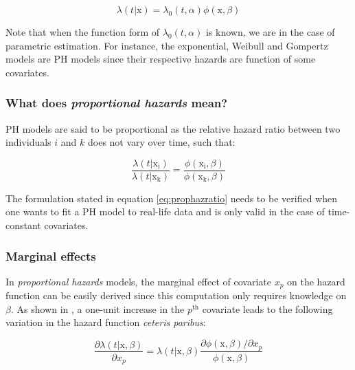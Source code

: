 \documentclass[
]{book}
\begin{document}
\begin{equation}
    \lambda(t|\pmb{\mathrm{x}}) = \lambda_0 (t,\alpha)  \phi(\pmb{\mathrm{x}}, \beta) 
    \label{eq:ph}
\end{equation}

Note that when the function form of \(\lambda_0 (t,\alpha)\) is known, we are in the case of parametric estimation. For instance, the exponential, Weibull and Gompertz models are PH models since their respective hazards are function of some covariates.

\hypertarget{what-does-proportional-hazards-mean}{%
\subsubsection*{\texorpdfstring{What does \emph{proportional hazards} mean?}{What does proportional hazards mean?}}\label{what-does-proportional-hazards-mean}}

PH models are said to be proportional as the relative hazard ratio between two individuals \(i\) and \(k\) does not vary over time, such that:

\begin{equation}
  \frac{\lambda(t|\mathrm{x_i})}{\lambda(t|\mathrm{x_k})} = \frac{\phi(\mathrm{x_i}, \beta) }{\phi(\mathrm{x_k}, \beta)}
  \label{eq:prophazratio}
\end{equation}

The formulation stated in equation \eqref{eq:prophazratio} needs to be verified when one wants to fit a PH model to real-life data and is only valid in the case of time-constant covariates.

\hypertarget{marginal-effects}{%
\subsubsection*{Marginal effects}\label{marginal-effects}}

In \emph{proportional hazards} models, the marginal effect of covariate \(x_p\) on the hazard function can be easily derived since this computation only requires knowledge on \(\beta\). As shown in \citet{CAMERON_TRIVEDI}, a one-unit increase in the \(p^{\text{th}}\) covariate leads to the following variation in the hazard function \emph{ceteris paribus}:

\begin{equation}
    \frac{\partial \lambda(t|\pmb{\mathrm{x}}, \beta)}{\partial x_p} = \lambda(t|\pmb{\mathrm{x}}, \beta) \frac{\partial \phi(\pmb{\mathrm{x}}, \beta) / \partial x_p}{\phi(\pmb{\mathrm{x}}, \beta) }
    \label{eq:meph}
\end{equation}
\end{document}

